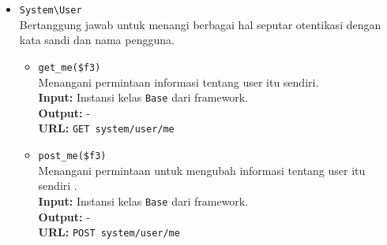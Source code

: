 \begin{itemize}
        \item \texttt{System\textbackslash User} \\
            Bertanggung jawab untuk menangi berbagai hal seputar otentikasi
            dengan kata sandi dan nama pengguna.
            \begin{itemize}
                \item \texttt{get\_me(\$f3)}\\
                    Menangani permintaan informasi tentang user itu sendiri.\\
                    \textbf{Input:} Instansi kelas \texttt{Base} dari
                    framework.\\
                    \textbf{Output:} -\\
                    \textbf{URL:} \texttt{GET system/user/me}
                
                \item \texttt{post\_me(\$f3)}\\
                    Menangani permintaan untuk mengubah informasi tentang user
                    itu sendiri .\\
                    \textbf{Input:} Instansi kelas \texttt{Base} dari
                    framework.\\
                    \textbf{Output:} -\\
                    \textbf{URL:} \texttt{POST system/user/me}
                    
            \end{itemize}
    \end{itemize}
    
